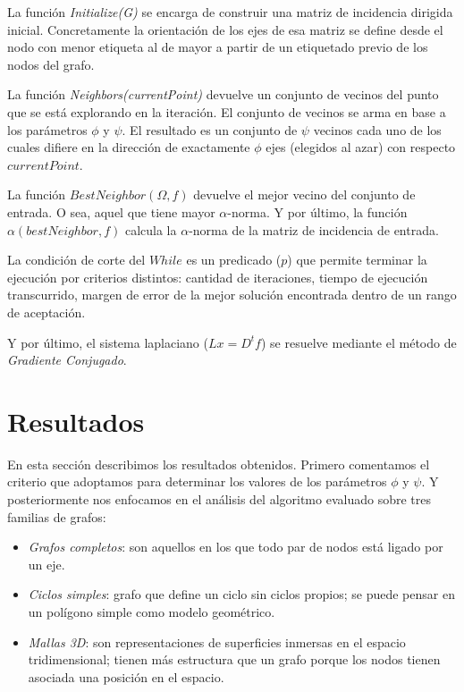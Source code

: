 \documentclass[conference,compsoc,a4paper]{IEEEtran}
\begin{document}
La función \emph{Initialize(G)} se encarga de construir 
una matriz de incidencia dirigida inicial. Concretamente la orientación 
de los ejes de esa matriz se define desde el nodo con menor 
etiqueta al de mayor a partir de un etiquetado previo de los nodos del 
grafo. 

\smallskip

La función \emph{Neighbors(currentPoint)} devuelve un conjunto de 
vecinos del punto que se está explorando en la iteración. El conjunto 
de vecinos se arma en base a los parámetros $\phi$ y $\psi$. El 
resultado es un conjunto de $\psi$ vecinos cada uno de los cuales 
difiere en la dirección de exactamente $\phi$ ejes (elegidos al azar) 
con respecto $currentPoint$.

\smallskip

La función $BestNeighbor(\Omega,f)$ devuelve el mejor vecino del conjunto 
de entrada. O sea, aquel que tiene mayor $\alpha$-norma. Y por último, 
la función $\alpha(bestNeighbor,f)$ calcula la $\alpha$-norma de la matriz 
de incidencia de entrada.

\smallskip

La condición de corte del $While$ es un predicado ($p$) que permite 
terminar la ejecución por criterios distintos: cantidad de iteraciones, 
tiempo de ejecución transcurrido, margen de error de la mejor solución 
encontrada dentro de un rango de aceptación.

\smallskip

Y por último, el sistema laplaciano ($Lx = D^t f$) se resuelve mediante 
el método de \emph{Gradiente Conjugado}.

\section{Resultados}

En esta sección describimos los resultados obtenidos. Primero 
comentamos el criterio que adoptamos para determinar los valores de los 
parámetros $\phi$ y $\psi$. Y posteriormente nos enfocamos en el 
análisis del algoritmo evaluado sobre tres familias de grafos: 

\begin{itemize}
	\item \emph{Grafos completos}: son aquellos en los que todo par de  
	nodos está ligado por un eje.
	\item \emph{Ciclos simples}: grafo que define un ciclo sin ciclos 
	propios; se puede pensar en un polígono simple como modelo 
	geométrico.
	\item \emph{Mallas 3D}: son representaciones de superficies 
	inmersas en el espacio tridimensional; tienen más estructura que un 
	grafo porque los nodos tienen asociada una posición en el espacio.
\end{itemize}
\end{document}
